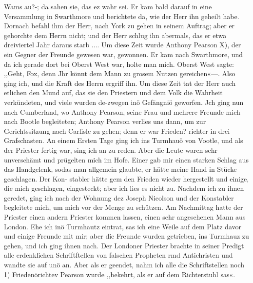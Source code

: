 Wams au?-; da sahen sie, das ez wahr sei. Er kam bald darauf
in eine Versammlung in Swarthmore und berichtete da, wie
der Herr ihn geheilt habe. Dornach befahl ihm der Herr, nach
York zu gehen in seinem Auftrag; aber er gehorchte dem Herrn
nicht; und der Herr schlug ihn abermals, das er etwa dreiviertel
Jahr daraus starb ....
Um diese Zeit wurde Anthony Pearson X), der ein Gegner der
Freunde gewesen war, gewonnen. Er kam nach Swarthmore,
und da ich gerade dort bei Oberst West war, holte man mich.
Oberst West sagte: ,,Geht, Fox, denn Jhr könnt dem Mann zu
grosem Nutzen gereichen«—. Also ging ich, und die Kraft des
Herrn ergriff ihn.
Um diese Zeit tat der Herr auch etlichen den Mund auf,
das sie den Priestern und dem Volk die Wahrheit verkündeten,
und viele wurden de-zwegen inö Gefängniö geworfen. Jch ging
nun nach Cumberland, wo Anthony Pearson, seine Frau und
mehrere Freunde mich nach Bootle begleiteten; Anthony Pearson
verlies uns dann, um zur Gerichtssitzung nach Carlisle zu gehen;
denn er war Frieden?-richter in drei Grafschasten. An einem
Ersten Tage ging ich ins Turmhauö von Vootle, und als der
Priester fertig war, sing ich an zu reden. Aber die Leute waren
sehr unverschämt und prügelten mich im Hofe. Einer gab mir
einen starken Schlag aus das Handgelenk, sodas man allgemein
glaubte, er hätte meine Hand in Stücke geschlagen. Der Kon-
stabler hätte gem den Frieden wieder hergestellt und einige, die
mich geschlagen, eingesteckt; aber ich lies es nicht zu. Nachdem
ich zu ihnen geredet, ging ich nach der Wohnung dez Joseph
Nicolson und der Konstabler begleitete mich, um mich vor der
Menge zu schützen.
Am Nachmittag hatte der Priester einen andern Priester
kommen lassen, einen sehr angesehenen Mann aus London. Ehe
ich inö Turmhautz eintrat, sas ich eine Weile auf dem Platz davor
und einige Freunde mit mir; aber die Freunde wurden getrieben, ins
Turmhauz zu gehen, und ich ging ihnen nach. Der Londoner
Priester brachte in seiner Predigt alle erdenklichen Schriftftellen
von falschen Propheten rmd Antichristen und wandte sie auf unö
an. Aber als er geendet, nahm ich alle die Schriftstellen noch
1) Friedenörichtev Pearson wurde ,,bekehrt, als er auf dem Richterstuhl sas«.


